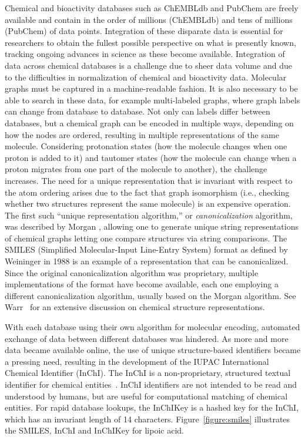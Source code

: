 \documentclass{sig-alternate}
\begin{document}
Chemical and bioactivity
databases such as ChEMBLdb and PubChem are freely
available and contain in the order of millions (ChEMBLdb) and tens of
millions (PubChem) of data points. Integration of these disparate
data is essential for researchers to obtain the fullest possible
perspective on what is presently known, tracking ongoing advances in
science as these become available. Integration of data
across chemical databases is a challenge due to sheer data volume and
due to the difficulties in normalization of chemical and bioactivity
data. Molecular graphs must be captured
in a machine-readable fashion. It is also necessary to be able to
search in these data, for example multi-labeled graphs, where graph labels can change
from database to database. Not only can labels differ between databases,
but a chemical graph can be encoded in multiple ways, depending on how
the nodes are ordered, resulting in multiple representations of the same
molecule. Considering protonation states
(how the molecule changes when one proton is added
to it) and tautomer states (how the molecule can change when a proton
migrates from one part of the molecule to another), the challenge
increases. The need for a unique representation that is invariant with
respect to the atom ordering arises due to the fact that graph
isomorphism (i.e., checking whether two structures represent the same molecule) is an
expensive operation. The first such ``unique representation
algorithm,'' or \emph{canonicalization} algorithm, was described by
Morgan \cite{Morgan1965}, allowing one to generate unique string
representations of chemical graphs letting one compare structures via
string comparisons. The SMILES (Simplified Molecular-Input Line-Entry
System) format as defined by Weininger in 1988
\cite{Weininger:1988kx} is an example of a
representation that can be canonicalized. Since the original
canonicalization algorithm was proprietary, multiple implementations
of the format have become available, each one employing a different
canonicalization algorithm, usually based on the Morgan algorithm. See
Warr~\cite{Warr:2011vn} for an extensive discussion on chemical
structure representations.

With each database using their own algorithm for molecular encoding,
automated exchange of data between different databases was hindered.
As more and more data became available online, the use of unique
structure-based identifiers became a pressing need, resulting in the
development of the IUPAC International Chemical Identifier (InChI). The
InChI is a non-proprietary, structured textual identifier for chemical
entities~\cite{inchi}. InChI identifiers are not intended to be read
and understood by humans, but are useful for computational matching of
chemical entities. For rapid database lookups, the InChIKey is a
hashed key for the InChI, which has an invariant length of 14
characters. Figure~\ref{figure:smiles} illustrates
the SMILES, InChI and InChIKey for lipoic acid.
\end{document}

